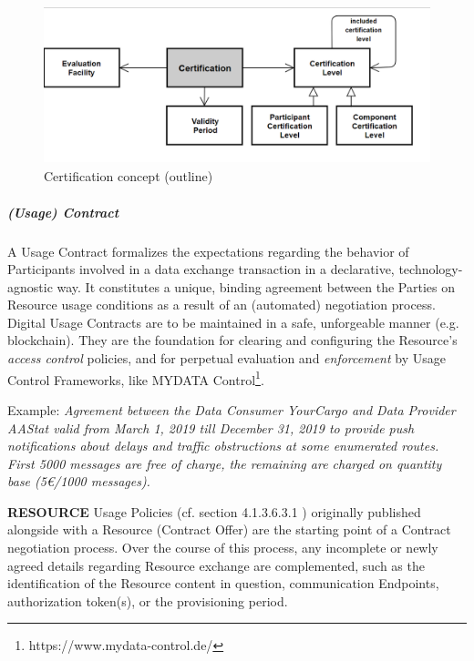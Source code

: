 
\begin{figure}[H]
	\begin{Center}
		\includegraphics[width=4.5in,height=1.81in]{./media/image51.png}
		\caption{Certification concept (outline)}
		\label{fig:Certification_concept_outline}
	\end{Center}
\end{figure}



\subparagraph*{(Usage) Contract}
A Usage Contract formalizes the expectations regarding the behavior of Participants involved in a data exchange transaction in a declarative, technology-agnostic way. It constitutes a unique, binding agreement between the Parties on Resource usage conditions as a result of an (automated) negotiation process. Digital Usage Contracts are to be maintained in a safe, unforgeable manner (e.g. blockchain). They are the foundation for clearing and configuring the Resource’s \textit{access control} policies, and for perpetual evaluation and \textit{enforcement }by Usage Control Frameworks, like MYDATA Control\footnote{https://www.mydata-control.de/ }. 

Example: \textit{Agreement between the Data Consumer YourCargo and Data Provider AAStat valid from March 1, 2019 till December 31, 2019 to provide push notifications about delays and traffic obstructions at some enumerated routes. First 5000 messages are free of charge, the remaining are charged on quantity base (5€/1000 messages).}

\textbf{RESOURCE} Usage Policies (cf. section 4.1.3.6.3.1%
) originally published alongside with a Resource (Contract Offer) are the starting point of a Contract negotiation process. Over the course of this process, any incomplete or newly agreed details regarding Resource exchange are complemented, such as the identification of the Resource content in question, communication Endpoints, authorization token(s), or the provisioning period. 

